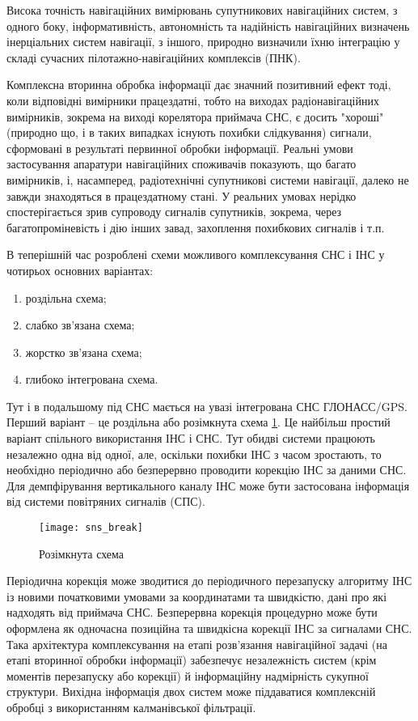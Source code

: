 Висока точність навігаційних вимірювань супутникових навігаційних систем, з одного боку, 
інформативність, автономність та надійність навігаційних визначень інерціальних систем 
навігації, з іншого, природно визначили їхню інтеграцію у складі сучасних  
пілотажно-навігаційних комплексів (ПНК).

Комплексна вторинна обробка інформації дає значний позитивний ефект тоді, 
коли відповідні вимірники працездатні, тобто на виходах радіонавігаційних 
вимірників, зокрема на виході корелятора приймача СНС,  є досить "хороші" 
(природно що, і в таких випадках  існують похибки слідкування) сигнали, 
сформовані в результаті первинної обробки інформації. Реальні умови застосування 
апаратури навігаційних споживачів показують, що багато вимірників, і, насамперед, 
радіотехнічні супутникові системи навігації, далеко не завжди знаходяться в 
працездатному стані. У реальних умовах нерідко спостерігається зрив супроводу 
сигналів супутників, зокрема, через багатопроміневість і дію інших завад, 
захоплення похибкових сигналів і т.п.

В теперішній час розроблені схеми можливого комплексування СНС і ІНС у чотирьох 
основних варіантах:
\begin{enumerate}
\item роздільна схема;
\item слабко зв'язана схема;
\item жорстко зв'язана схема;
\item глибоко інтегрована схема.
\end{enumerate}

Тут і в подальшому під СНС мається на увазі інтегрована СНС ГЛОНАСС/GPS. 
Перший варіант -- це роздільна або розімкнута схема \ref{fig:isns_break}.  Це  найбільш 
простий варіант спільного використання ІНС і СНС. Тут обидві системи працюють незалежно 
одна від одної, але, оскільки похибки ІНС з часом зростають, то необхідно періодично
або безперервно проводити корекцію ІНС за даними СНС. Для демпфірування вертикального 
каналу ІНС може бути застосована інформація від системи повітряних сигналів (СПС).

\begin{figure}[here]
\centering
\texttt{[image: sns\_break]}
\caption{Розімкнута схема}
\label{fig:isns_break}
\end{figure}

Періодична корекція може зводитися до періодичного перезапуску алгоритму ІНС із новими 
початковими умовами за координатами та швидкістю, дані про які надходять від приймача СНС. 
Безперервна корекція процедурно може бути оформлена як одночасна позиційна та 
швидкісна корекції ІНС за сигналами СНС. Така архітектура комплексування на  
етапі розв'язання навігаційної задачі (на етапі вторинної обробки інформації) 
забезпечує незалежність систем (крім моментів  перезапуску або корекції) й 
інформаційну надмірність сукупної структури. Вихідна інформація двох систем може 
піддаватися комплексній обробці з використанням калманівської фільтрації.

